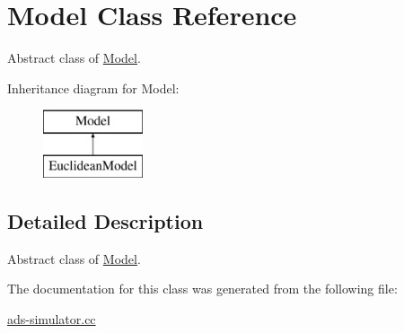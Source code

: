 \hypertarget{classModel}{}\section{Model Class Reference}
\label{classModel}


Abstract class of \hyperlink{classModel}{Model}.  


Inheritance diagram for Model\+:\begin{figure}[H]
\begin{center}
\leavevmode
\includegraphics[height=2.000000cm]{classModel}
\end{center}
\end{figure}


\subsection{Detailed Description}
Abstract class of \hyperlink{classModel}{Model}. 

The documentation for this class was generated from the following file\+:\begin{DoxyCompactItemize}
\item 
\hyperlink{ads-simulator_8cc}{ads-\/simulator.\+cc}\end{DoxyCompactItemize}
